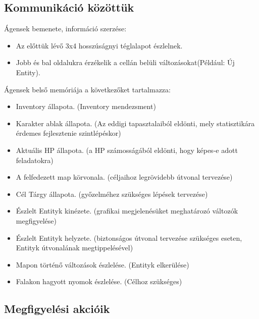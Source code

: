 \subsection{Kommunikáció közöttük}

Ágensek bemenete, információ szerzése:
\begin{itemize}
    \item Az előttük lévő 3x4 hosszúságnyi téglalapot észlelnek.
    \item Jobb és bal oldalukra érzékelik a cellán belüli változásokat(Például: Új Entity).
\end{itemize}

\noindent Ágensek belső memóriája a következőket tartalmazza:
\begin{itemize}
    \item Inventory állapota. (Inventory mendezsment)
    \item Karakter ablak állapota. (Az eddigi tapasztalaiból eldönti, mely statisztikára érdemes fejlesztenie szintlépéskor)
    \item Aktuális HP állapota. (a HP számosságából eldönti, hogy képes-e adott feladatokra)
    \item A felfedezett map körvonala. (céljaihoz legrövidebb útvonal tervezése)
    \item Cél Tárgy állapota. (győzelméhez szükséges lépések tervezése)
    \item Észlelt Entityk kinézete. (grafikai megjelenésüket meghatározó változók megfigyelése)
    \item Észlelt Entityk helyzete. (biztonságos útvonal tervezése szükséges eseten, Entityk útvonalának megtippelésével)
    \item Mapon történő változások észlelése. (Entityk elkerülése)
    \item Falakon hagyott nyomok észlelése. (Célhoz szükséges)
\end{itemize}

\subsection{Megfigyelési akcióik}

